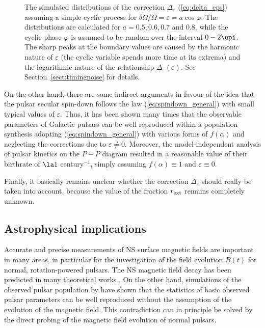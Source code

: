 \documentclass[fleqn,usenatbib]{mnras}
\begin{document}
\begin{figure}
    {\centering {} \par}
    \caption{The simulated distributions of the correction $\Delta_{\varepsilon}$ (\ref{eq:delta_eps}) assuming
a simple cyclic process for $\delta \dot \Omega/\dot \Omega = \varepsilon =
a\cos\varphi$. The distributions are calculated for $a = 0.5, 0.6, 0.7$ and $0.8$, while the cyclic phase $\varphi$ is assumed to
be random over the interval $0-2\upi$. The sharp peaks at the boundary values
are caused by the harmonic nature of $\varepsilon$ (the cyclic variable spends more
time at its extrema) and the logarithmic nature of the relationship $\Delta_{\varepsilon}(\varepsilon)$.
See Section~\ref{sect:timingnoise} for details.}
    \label{fig:delta_epsilon}
\end{figure}

On the other hand, there are some indirect arguments in favour of
the idea that the pulsar secular spin-down follows the law (\ref{eq:spindown_general}) with
small typical values of $\varepsilon$. Thus, it has been shown many times that the
observable parameters of Galactic pulsars can be well reproduced
within a population synthesis adopting (\ref{eq:spindown_general}) with various forms of
$f(\alpha)$ \citep
[e.g][]{fgk06, ridley10, gullon14} and neglecting the corrections due to $\varepsilon \neq 0$.
Moreover, the model-independent analysis of pulsar kinetics on the
$P-\dot P$ diagram resulted in a reasonable value of their birthrate of
$\la 1$ century$^{-1}$, simply assuming $f(\alpha) \equiv 1$ \citep{kk08, vm11} and $\varepsilon \equiv 0$.

Finally, it basically remains unclear whether the correction $\Delta_{\varepsilon}$
should really be taken into account, because the value of the fraction
$r_{\rm ext}$ remains completely unknown.

\subsection{Astrophysical implications}
\label{sect:implicat}

Accurate and precise measurements of NS surface magnetic fields
are important in many areas, in particular for the investigation of
the field evolution $B(t)$ for normal, rotation-powered pulsars. The
NS magnetic field decay has been predicted in many theoretical
works \citep{ogunn69, goldr92, cumming04, pons07,
geppert09, vigano13, ip15}. On the other hand,
simulations of the observed pulsar population by \cite{fgk06} have shown that the statistics of basic observed
pulsar parameters can be well reproduced without the assumption
of the evolution of the magnetic field. This contradiction can in
principle be solved by the direct probing of the magnetic field
evolution of normal pulsars.
\end{document}
